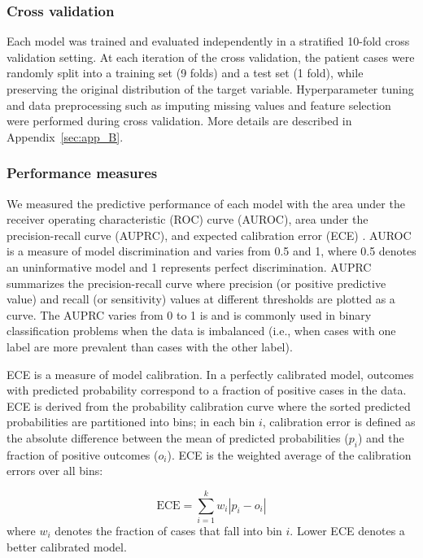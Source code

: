 \subsubsection{Cross validation}\label{sec:crossvalidation}
Each model was trained and evaluated independently in a stratified 10-fold cross validation setting. At each iteration of the cross validation, the patient cases were randomly split into a training set (9 folds) and a test set (1 fold), while preserving the original distribution of the target variable. Hyperparameter tuning and data preprocessing such as imputing missing values and feature selection were performed during cross validation. More details are described in Appendix~\ref{sec:app_B}.

\subsubsection{Performance measures}\label{sec:measures}
We measured the predictive performance of each model with the area under the receiver operating characteristic (ROC) curve (AUROC), area under the precision-recall curve (AUPRC), and expected calibration error (ECE) \cite{Naeini2015}. AUROC is a measure of model discrimination and varies from 0.5 and 1, where 0.5 denotes an uninformative model and 1 represents perfect discrimination. AUPRC summarizes the precision-recall curve where precision (or positive predictive value) and recall (or sensitivity) values at different thresholds are plotted as a curve. The AUPRC varies from 0 to 1 is and is commonly used in binary classification problems when the data is imbalanced (i.e., when cases with one label are more prevalent than cases with the other label).

ECE is a measure of model calibration. In a perfectly calibrated model, outcomes with predicted probability  correspond to a fraction  of positive cases in the data. ECE is derived from the probability calibration curve \cite{degroot1983comparison} where the sorted predicted probabilities are partitioned into  bins; in each bin $i$, calibration error is defined as the absolute difference between the mean of predicted probabilities ($p_i$) and the fraction of positive outcomes ($o_i$). ECE is the weighted average of the calibration errors over all  bins:

\begin{equation}\label{eq:1}
   \text{ECE} = \sum_{i=1}^{k}{w_i |p_i - o_i|} 
\end{equation}
where $w_i$  denotes the fraction of cases that fall into bin $i$. Lower ECE denotes a better calibrated model.


